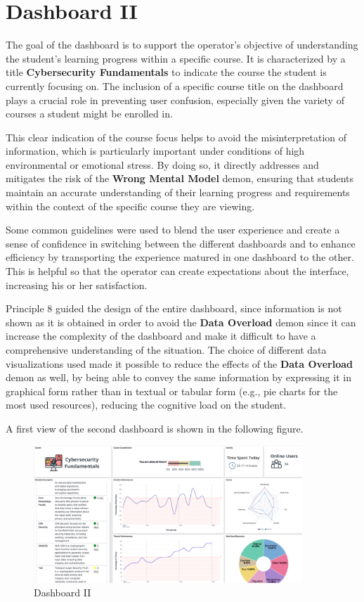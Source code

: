 \section{Dashboard II}

The goal of the dashboard is to support the operator's objective of understanding the student's learning progress within a specific course. It is characterized by a title \textbf{Cybersecurity Fundamentals} to indicate the course the student is currently focusing on. The inclusion of a specific course title on the dashboard plays a crucial role in preventing user confusion, especially given the variety of courses a student might be enrolled in. 

This clear indication of the course focus helps to avoid the misinterpretation of information, which is particularly important under conditions of high environmental or emotional stress. By doing so, it directly addresses and mitigates the risk of the \textbf{Wrong Mental Model} demon, ensuring that students maintain an accurate understanding of their learning progress and requirements within the context of the specific course they are viewing. 

Some common guidelines were used to blend the user experience and create a sense of confidence in switching between the different dashboards and to enhance efficiency by transporting the experience matured in one dashboard to the other. This is helpful so that the operator can create expectations about the interface, increasing his or her satisfaction.


Principle 8 guided the design of the entire dashboard, since information is not shown as it is obtained in order to avoid the \textbf{Data Overload} demon since it can increase the complexity of the dashboard and make it difficult to have a comprehensive understanding of the situation.
The choice of different data visualizations used made it possible to reduce the effects of the \textbf{Data Overload} demon as well, by being able to convey the same information by expressing it in graphical form rather than in textual or tabular form (e.g., pie charts for the most used resources), reducing the cognitive load on the student. 

A first view of the second dashboard is shown in the following figure.

\begin{figure}[H]
    \centering
    \includegraphics[width=0.9\textwidth]{assets/dashboard_2.png}
    \caption{Dashboard II}
    \label{fig:dashboard_2}
\end{figure}

